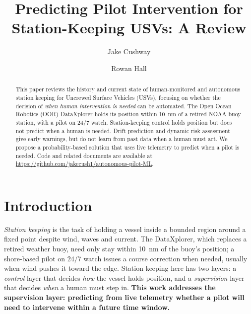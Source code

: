 \documentclass[sigconf]{acmart}
\begin{document}
\title{Predicting Pilot Intervention for Station-Keeping USVs: A Review}
\author{Jake Cushway}

\author{Rowan Hall}

\begin{abstract}
This paper reviews the history and current state of human-monitored and autonomous station keeping for Uncrewed Surface Vehicles (USVs), focusing on whether the decision of \textit{when human intervention is needed} can be automated. The Open Ocean Robotics (OOR) DataXplorer\texttrademark{} holds its position within 10~nm of a retired NOAA buoy station, with a pilot on 24/7 watch. Station-keeping control holds position but does not predict when a human is needed. Drift prediction and dynamic risk assessment give early warnings, but do not learn from past data when a human must act. We propose a probability-based solution that uses live telemetry to predict when a pilot is needed. Code and related documents are available at \url{https://github.com/jakecush1/autonomous-pilot-ML}.
\end{abstract}

\maketitle
\pagestyle{empty} 

\section{Introduction}\label{sec:intro}
\textit{Station keeping} is the task of holding a vessel inside a bounded region around a fixed point despite wind, waves and current. The DataXplorer, which replaces a retired weather buoy, need only stay within 10~nm of the buoy's position; a shore-based pilot on 24/7 watch issues a course correction when needed, usually when wind pushes it toward the edge. Station keeping here has two layers: a \textit{control} layer that decides \textit{how} the vessel holds position, and a \textit{supervision} layer that decides \textit{when} a human must step in. \textbf{This work addresses the supervision layer: predicting from live telemetry whether a pilot will need to intervene within a future time window.}
\end{document}
